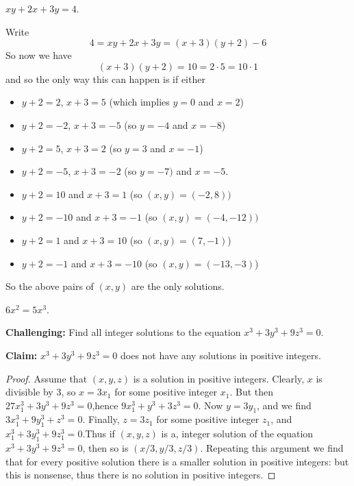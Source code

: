 \documentclass[11pt,dvipsnames]{book}
\numberwithin{figure}{section} %
\numberwithin{table}{section} %
\begin{document}
\begin{exercise}
$xy+2x+3y=4$.

\begin{solution}
Write
\[
4=xy+2x+3y =(x+3)(y+2)-6
\]
So now we have
\[
(x+3)(y+2)=10=2\cdot 5=10\cdot 1\]
and so the only way this can happen is if either
\begin{itemize}
\item $y+2=2$, $x+3=5$ (which implies $y=0$ and $x=2$)
\item $y+2=-2$, $x+3=-5$ (so $y=-4$ and $x=-8$)
\item $y+2=5$, $x+3=2$ (so $y=3$ and $x=-1$)
\item $y+2=-5$, $x+3=-2$ (so $y=-7)$ and $x=-5$.
\item $y+2=10$ and $x+3=1$ (so $(x,y)=(-2,8))$
\item $y+2=-10$ and $x+3=-1$ (so $(x,y)=(-4,-12))$
\item $y+2=1$ and $x+3=10$ (so $(x,y)=(7,-1)$)
\item $y+2=-1$ and $x+3=-10$ (so $(x,y)=(-13,-3)$)
\end{itemize}
So the above pairs of $(x,y)$ are the only solutions.
\end{solution}

\end{exercise}

\begin{exercise}
 $6x^2=5x^3$.

\end{exercise}

\begin{exercise} {\bf Challenging:} Find all integer solutions to the equation $x^3+3y^3+9z^3= 0$.

\begin{solution}
{\bf Claim:} $x^3+3y^3+9z^3= 0$ does not have any solutions in positive integers.

\begin{proof}
Assume that $(x, y, z)$ is a solution in positive integers. Clearly, $x$ is divisible by $3$, so $x= 3x_1$ for some positive integer $x_1$. But then $27x_{1}^{3}+3y^3+9z^3= 0$,hence $9x_1^3+y^3+3z^3= 0$. Now $y= 3y_1$, and we find $3x_1^3+9y^{3}_{1}+z^3= 0$. Finally, $z= 3z_1$ for some positive integer $z_1$, and $x_{1}^{3}+ 3y_{1}^{3}+ 9z_{1}^{3}= 0$.Thus if $(x, y, z)$ is a, integer solution of the equation $x^3+3y^3+9z^3= 0$, then so is $(x/3,y/3,z/3)$. Repeating this argument we find that for every positive solution there is a smaller solution in positive integers: but this is nonsense, thus there is no solution in positive integers.
\end{proof}
\end{solution}

\end{exercise}
\end{document}
